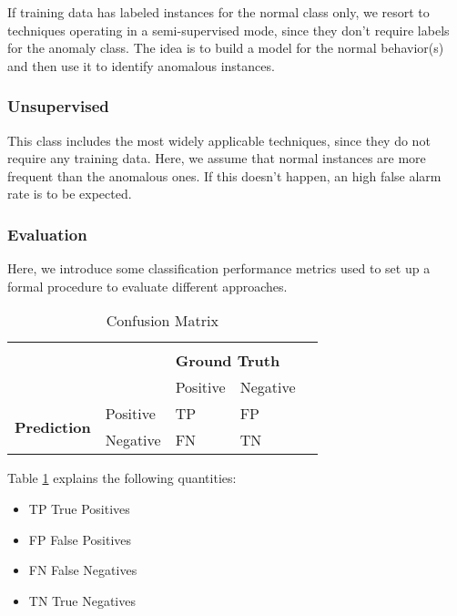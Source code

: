 If training data has labeled instances for the normal class only, we resort to techniques operating in a semi-supervised mode, since they don't require labels for the anomaly class. The idea is to build a model for the normal behavior(s) and then use it to identify anomalous instances.

\subsubsection{Unsupervised}

This class includes the most widely applicable techniques, since they do not require any training data. Here, we assume that normal instances are more frequent than the anomalous ones. If this doesn't happen, an high false alarm rate is to be expected.


\subsubsection{Evaluation}

Here, we introduce some classification performance metrics used to set up a formal procedure to evaluate different approaches.

\begin{table}[]
	\centering
	\begin{tabular}{lllll}
		                                     &          &                                           &          & \\
		\multirow{2}{*}{}                    &          & \multicolumn{2}{l}{\textbf{Ground Truth}} &            \\
		                                     &          & Positive                                  & Negative & \\
		\multirow{2}{*}{\textbf{Prediction}} & Positive & TP                                        & FP       & \\
		                                     & Negative & FN                                        & TN       &
	\end{tabular}
	\caption{Confusion Matrix}
	\label{table:confusion_matrix}
\end{table}

Table \ref{table:confusion_matrix} explains the following quantities:

\begin{itemize}
	\item TP True Positives
	\item FP False Positives
	\item FN False Negatives
	\item TN True Negatives
\end{itemize}

